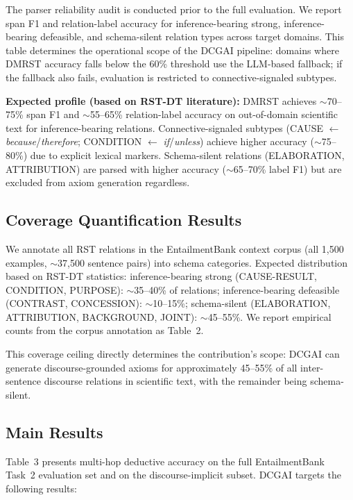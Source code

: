 \documentclass[11pt,letterpaper]{article}
\begin{document}
The parser reliability audit is conducted prior to the full evaluation. We report span F1 and relation-label accuracy
for inference-bearing strong, inference-bearing defeasible, and schema-silent relation types across target domains.
This table determines the operational scope of the DCGAI pipeline: domains where DMRST accuracy falls below the 60\%
threshold use the LLM-based fallback; if the fallback also fails, evaluation is restricted to connective-signaled
subtypes.

\textbf{Expected profile (based on RST-DT literature):} DMRST achieves $\sim$70--75\% span F1 and $\sim$55--65\%
relation-label accuracy on out-of-domain scientific text for inference-bearing relations. Connective-signaled subtypes
(CAUSE $\leftarrow$ \textit{because}/\textit{therefore}; CONDITION $\leftarrow$ \textit{if}/\textit{unless}) achieve
higher accuracy ($\sim$75--80\%) due to explicit lexical markers. Schema-silent relations (ELABORATION, ATTRIBUTION)
are parsed with higher accuracy ($\sim$65--70\% label F1) but are excluded from axiom generation regardless.

\subsection{Coverage Quantification Results}

We annotate all RST relations in the EntailmentBank context corpus (all 1,500 examples, $\sim$37,500 sentence pairs)
into schema categories. Expected distribution based on RST-DT statistics: inference-bearing strong (CAUSE-RESULT,
CONDITION, PURPOSE): $\sim$35--40\% of relations; inference-bearing defeasible (CONTRAST, CONCESSION): $\sim$10--15\%;
schema-silent (ELABORATION, ATTRIBUTION, BACKGROUND, JOINT): $\sim$45--55\%. We report empirical counts from the
corpus annotation as Table~2.

This coverage ceiling directly determines the contribution's scope: DCGAI can generate discourse-grounded axioms for
approximately 45--55\% of all inter-sentence discourse relations in scientific text, with the remainder being
schema-silent.

\subsection{Main Results}

Table~3 presents multi-hop deductive accuracy on the full EntailmentBank Task~2 evaluation set and on the
discourse-implicit subset. DCGAI targets the following results:
\end{document}
